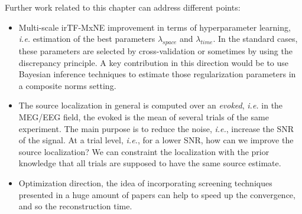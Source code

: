 Further work related to this chapter can address different points:
\begin{itemize}
	\item Multi-scale irTF-MxNE improvement in terms of hyperparameter learning, \textit{i.e.} estimation of the best parameters $\lambda_{space}$ and $\lambda_{time}$. In the standard cases, these parameters are selected by cross-validation or sometimes by using the discrepancy principle. A key contribution in this direction would be to use Bayesian inference techniques to estimate those regularization parameters in a composite norms setting.
    
    \item The source localization in general is computed over an \textit{evoked}, \textit{i.e.} in the MEG/EEG field, the evoked is the mean of several trials of the same experiment. The main purpose is to reduce the noise, \textit{i.e.}, increase the SNR of the signal. At a trial level, \textit{i.e.}, for a lower SNR, how can we improve the source localization? We can constraint the localization with the prior knowledge that all trials are supposed to have the same source estimate.
    
    \item Optimization direction, the idea of incorporating screening techniques presented in a huge amount of papers can help to speed up the convergence, and so the reconstruction time\cite{massias2017safe,massiasgap,fercoq-etal:2015,Ndiaye_Fercoq_Gramfort_Salmon15,ndiaye2016gap,ndiaye2017efficient}.
\end{itemize}

